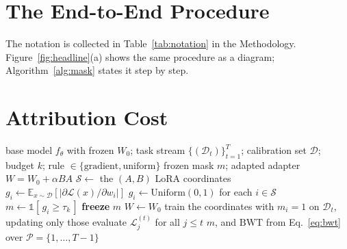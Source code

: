 \section{The End-to-End Procedure}
\label{app:notation}

The notation is collected in Table~\ref{tab:notation} in the Methodology. Figure~\ref{fig:headline}(a) shows the same procedure as a diagram; Algorithm~\ref{alg:mask} states it step by step.


\section{Attribution Cost}
\label{app:attribution_cost}


\begin{algorithm}[t]
\caption{Masked continual fine-tuning with a frozen selection mask}
\label{alg:mask}
\small
\begin{algorithmic}[1]
\Require base model $f_\theta$ with frozen $W_0$; task stream $\{(\mathcal{D}_t)\}_{t=1}^{T}$; calibration set $\mathcal{D}$; budget $k$; rule $\in \{\text{gradient}, \text{uniform}\}$
\Ensure frozen mask $m$; adapted adapter $W = W_0 + \alpha BA$
\State $\mathcal{S} \gets$ the $(A,B)$ LoRA coordinates 
        \State $g_i \gets \mathbb{E}_{x \sim \mathcal{D}}\left[\left|\partial \mathcal{L}(x) / \partial w_i\right|\right]$ 
    \EndFor
\Else
    \State $g_i \gets \mathrm{Uniform}(0,1)$ for each $i \in \mathcal{S}$
\EndIf
\State $m \gets \mathbb{1}[\,g_i \geq \tau_k\,]$ 
\State \textbf{freeze} $m$ 
\State $W \gets W_0$ 
    \State train the coordinates with $m_i = 1$ on $\mathcal{D}_t$, updating only those
    \State evaluate $\mathcal{L}_j^{(t)}$ for all $j \le t$ 
\EndFor
\State \Return $m$, and $\mathrm{BWT}$ from Eq.~\eqref{eq:bwt} over $\mathcal{P} = \{1,\dots,T-1\}$
\end{algorithmic}
\end{algorithm}

